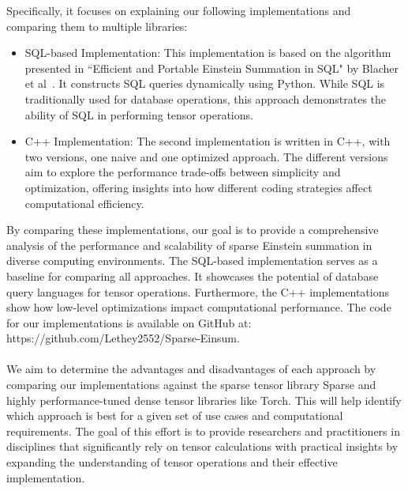 Specifically, it focuses on explaining our following implementations and comparing them
to multiple libraries:
%
\begin{itemize}
      \item SQL-based Implementation:
            This implementation is based on the algorithm presented in ``Efficient and
            Portable Einstein Summation in SQL" by Blacher et al~\cite{sql_einsum}.
            It constructs SQL queries dynamically using Python. While SQL is
            traditionally used for database operations, this approach demonstrates
            the ability of SQL in performing tensor operations.
      \item C++ Implementation: The second implementation is written in C++, with two
            versions, one naive and one optimized approach. The different versions
            aim to explore the performance trade-offs between simplicity and optimization,
            offering insights into how different coding strategies affect computational
            efficiency.
\end{itemize}
%
%
By comparing these implementations, our goal is to provide a comprehensive analysis of
the performance and scalability of sparse Einstein summation in diverse computing
environments. The SQL-based implementation serves as a baseline for comparing all
approaches. It showcases the potential of database query languages for tensor operations.
Furthermore, the C++ implementations show how low-level optimizations impact
computational performance. The code for our implementations is available on
GitHub at: https://github.com/Lethey2552/Sparse-Einsum.
\\
\\
We aim to determine the advantages and disadvantages of each approach by comparing
our implementations against the sparse tensor library Sparse and highly performance-tuned
dense tensor libraries like Torch. This will help identify which approach is best
for a given set of use cases and computational requirements. The goal of this effort
is to provide researchers and practitioners in disciplines that significantly rely
on tensor calculations with practical insights by expanding the understanding of
tensor operations and their effective implementation.
